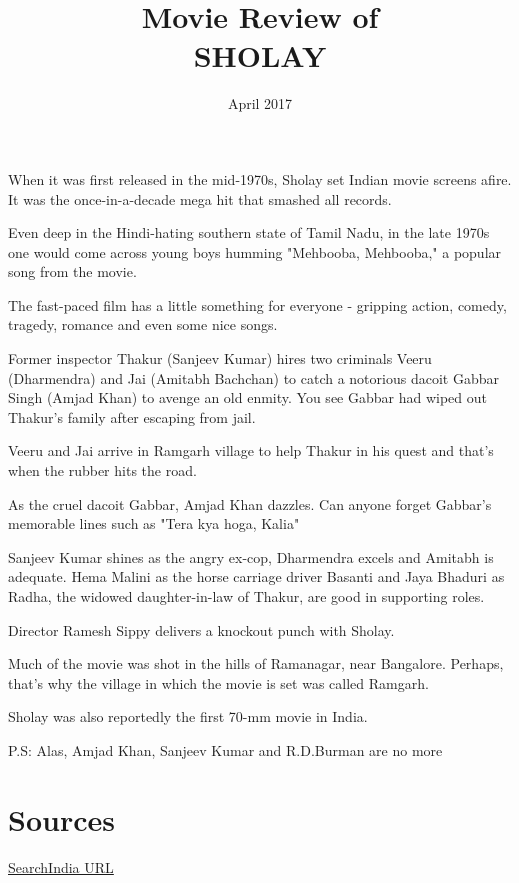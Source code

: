 \documentclass{article}
\title{Movie Review of\\\textsc{\LARGE{SHOLAY}}}
\date{April 2017}
\begin{document}
\maketitle

\section*{}

When it was first released in the mid-1970s, Sholay set Indian movie screens afire. It was the once-in-a-decade mega hit that smashed all records.

Even deep in the Hindi-hating southern state of Tamil Nadu, in the late 1970s one would come across young boys humming "Mehbooba, Mehbooba," a popular song from the movie.

The fast-paced film has a little something for everyone - gripping action, comedy, tragedy, romance and even some nice songs. 

Former inspector Thakur (Sanjeev Kumar) hires two criminals Veeru (Dharmendra) and Jai (Amitabh Bachchan) to catch a notorious dacoit Gabbar Singh (Amjad Khan) to avenge an old enmity. You see Gabbar had wiped out Thakur's family after escaping from jail.

Veeru and Jai arrive in Ramgarh village to help Thakur in his quest and that's when the rubber hits the road.

As the cruel dacoit Gabbar, Amjad Khan dazzles. Can anyone forget Gabbar's memorable lines such as "Tera kya hoga, Kalia"

Sanjeev Kumar shines as the angry ex-cop, Dharmendra excels and Amitabh is adequate. Hema Malini as the horse carriage driver Basanti and Jaya Bhaduri as Radha, the widowed daughter-in-law of Thakur, are good in supporting roles.

Director Ramesh Sippy delivers a knockout punch with Sholay.

Much of the movie was shot in the hills of Ramanagar, near Bangalore. Perhaps, that's why the village in which the movie is set was called Ramgarh.

Sholay was also reportedly the first 70-mm movie in India.

P.S: Alas, Amjad Khan, Sanjeev Kumar and R.D.Burman are no more

\section*{Sources}
\href{http://www.searchindia.com/search/bollywood-movies/sholay.html}{SearchIndia URL}
\end{document}
